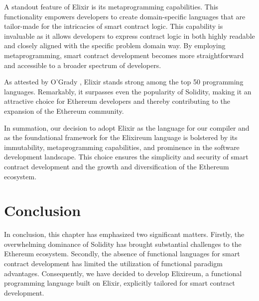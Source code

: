 A standout feature of Elixir is its metaprogramming capabilities. This functionality empowers developers to create domain-specific languages that are tailor-made for the intricacies of smart contract logic. This capability is invaluable as it allows developers to express contract logic in both highly readable and closely aligned with the specific problem domain way. By employing metaprogramming, smart contract development becomes more straightforward and accessible to a broader spectrum of developers.

As attested by O'Grady \cite{RedMonk}, Elixir stands strong among the top 50 programming languages. Remarkably, it surpasses even the popularity of Solidity, making it an attractive choice for Ethereum developers and thereby contributing to the expansion of the Ethereum community.

In summation, our decision to adopt Elixir as the language for our compiler and as the foundational framework for the Elixireum language is bolstered by its immutability, metaprogramming capabilities, and prominence in the software development landscape. This choice ensures the simplicity and security of smart contract development and the growth and diversification of the Ethereum ecosystem.

\section{Conclusion}
\label{sec:conc}

In conclusion, this chapter has emphasized two significant matters. Firstly, the overwhelming dominance of Solidity has brought substantial challenges to the Ethereum ecosystem. Secondly, the absence of functional languages for smart contract development has limited the utilization of functional paradigm advantages. Consequently, we have decided to develop Elixireum, a functional programming language built on Elixir, explicitly tailored for smart contract development.

